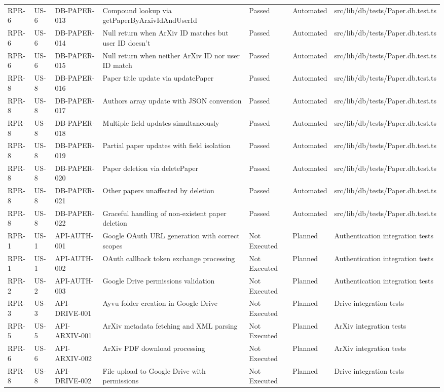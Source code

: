 \documentclass[12pt]{article}
\begin{document}
\begin{longtable}{|l|l|l|l|l|l|l|}
  RPR-6 & US-6 & DB-PAPER-013 & Compound lookup via getPaperByArxivIdAndUserId & Passed & Automated & src/lib/db/tests/Paper.db.test.ts \\
  RPR-6 & US-6 & DB-PAPER-014 & Null return when ArXiv ID matches but user ID doesn't & Passed & Automated & src/lib/db/tests/Paper.db.test.ts \\
  RPR-6 & US-6 & DB-PAPER-015 & Null return when neither ArXiv ID nor user ID match & Passed & Automated & src/lib/db/tests/Paper.db.test.ts \\
  RPR-8 & US-8 & DB-PAPER-016 & Paper title update via updatePaper & Passed & Automated & src/lib/db/tests/Paper.db.test.ts \\
  RPR-8 & US-8 & DB-PAPER-017 & Authors array update with JSON conversion & Passed & Automated & src/lib/db/tests/Paper.db.test.ts \\
  RPR-8 & US-8 & DB-PAPER-018 & Multiple field updates simultaneously & Passed & Automated & src/lib/db/tests/Paper.db.test.ts \\
  RPR-8 & US-8 & DB-PAPER-019 & Partial paper updates with field isolation & Passed & Automated & src/lib/db/tests/Paper.db.test.ts \\
  RPR-8 & US-8 & DB-PAPER-020 & Paper deletion via deletePaper & Passed & Automated & src/lib/db/tests/Paper.db.test.ts \\
  RPR-8 & US-8 & DB-PAPER-021 & Other papers unaffected by deletion & Passed & Automated & src/lib/db/tests/Paper.db.test.ts \\
  RPR-8 & US-8 & DB-PAPER-022 & Graceful handling of non-existent paper deletion & Passed & Automated & src/lib/db/tests/Paper.db.test.ts \\
  \hline
  RPR-1 & US-1 & API-AUTH-001 & Google OAuth URL generation with correct scopes & Not Executed & Planned & Authentication integration tests \\
  RPR-1 & US-1 & API-AUTH-002 & OAuth callback token exchange processing & Not Executed & Planned & Authentication integration tests \\
  RPR-2 & US-2 & API-AUTH-003 & Google Drive permissions validation & Not Executed & Planned & Authentication integration tests \\
  RPR-3 & US-3 & API-DRIVE-001 & Ayvu folder creation in Google Drive & Not Executed & Planned & Drive integration tests \\
  RPR-5 & US-5 & API-ARXIV-001 & ArXiv metadata fetching and XML parsing & Not Executed & Planned & ArXiv integration tests \\
  RPR-6 & US-6 & API-ARXIV-002 & ArXiv PDF download processing & Not Executed & Planned & ArXiv integration tests \\
  RPR-8 & US-8 & API-DRIVE-002 & File upload to Google Drive with permissions & Not Executed & Planned & Drive integration tests \\
\end{longtable}
\end{document}
